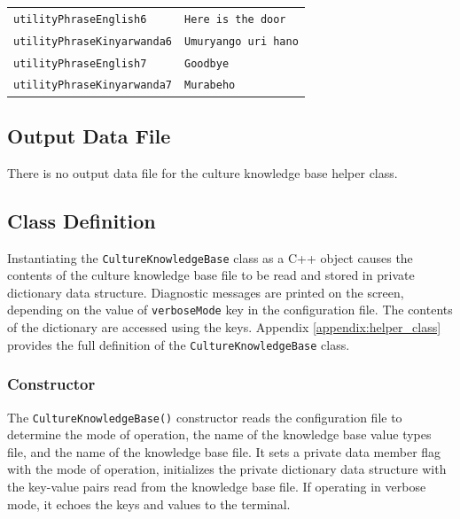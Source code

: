 \documentclass{CSSRforAfrica}
\begin{document}
\begin{table}[H]
\begin{tabular}{l l}
{\footnotesize \verb+utilityPhraseEnglish6+} 	                          & {\footnotesize \verb+Here is the door+} \vspace{-1.5mm}\\
{\footnotesize \verb+utilityPhraseKinyarwanda6+} 	                  & {\footnotesize \verb+Umuryango uri hano+} \vspace{-1.5mm}\\
{\footnotesize \verb+utilityPhraseEnglish7+} 	                          & {\footnotesize \verb+Goodbye+} \vspace{-1.5mm}\\
{\footnotesize \verb+utilityPhraseKinyarwanda7+} 	                  & {\footnotesize \verb+Murabeho+} \vspace{-1.5mm}\\
\end{tabular}
\end{table}

\subsection{Output Data File}
There is no output data file for the culture knowledge base helper class. 


\subsection{Class Definition}
Instantiating the {\tt\small CultureKnowledgeBase} class as a C++ object causes the contents of the  culture knowledge base file to be read and stored in private  dictionary data structure. Diagnostic messages are printed on the screen, depending on the value of \texttt{verboseMode} key in the configuration file. The contents of the dictionary are accessed using the keys. 
Appendix \ref{appendix:helper_class} provides the full definition of the {\tt\small CultureKnowledgeBase} class.

\subsubsection{Constructor}

The  {\tt\small CultureKnowledgeBase()} constructor reads the configuration file to determine the mode of operation, the name of the knowledge base value types file, and  the name of the knowledge base file. It sets a private data member flag with the mode of operation, initializes the private dictionary data structure with the key-value pairs read from the knowledge base file. If operating in verbose mode, it echoes the keys and values to the terminal.
\end{document}
